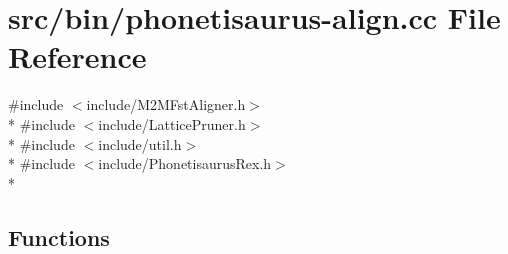 \hypertarget{phonetisaurus-align_8cc}{}\section{src/bin/phonetisaurus-\/align.cc File Reference}
\label{phonetisaurus-align_8cc}
{\ttfamily \#include $<$include/\+M2\+M\+Fst\+Aligner.\+h$>$}\\*
{\ttfamily \#include $<$include/\+Lattice\+Pruner.\+h$>$}\\*
{\ttfamily \#include $<$include/util.\+h$>$}\\*
{\ttfamily \#include $<$include/\+Phonetisaurus\+Rex.\+h$>$}\\*
\subsection*{Functions}
